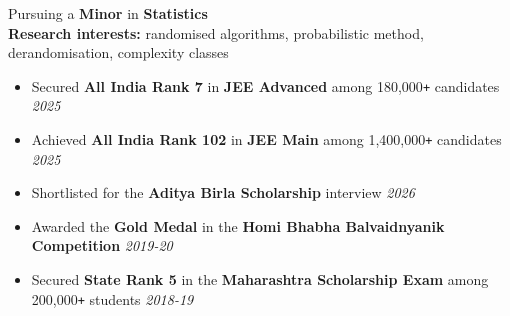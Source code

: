 \documentclass[11pt]{article}
\newcommand{\yr}[1]{\unskip\nobreak\hfill\mbox{\sl\small #1}}
\newcommand{\xfill}[2][1ex]{%
	\dimen0=#2\advance\dimen0 by #1
	\leaders\hrule height \dimen0 depth -#1\hfill
}
\renewcommand{\section}[1]{%
	\par\vspace{9pt}
	{\color{Blue}{\Large\scshape\raggedright #1\xfill[0pt]{0.5pt}}}\par\vspace{3pt}
}
\begin{document}
Pursuing a {\bf Minor} in {\bf Statistics} \\
{\bf Research interests:} randomised algorithms, probabilistic method, derandomisation, complexity classes


\section{Scholastic Achievements}

\begin{itemize}
    \item Secured \textbf{All India Rank 7} in \textbf{JEE Advanced} among 180,000\texttt{+} candidates \yr{2025}
    \item Achieved \textbf{All India Rank 102} in \textbf{JEE Main} among 1,400,000\texttt{+} candidates \yr{2025}
    \item Shortlisted for the \textbf{Aditya Birla Scholarship} interview \yr{2026}
    \item Awarded the \textbf{Gold Medal} in the \textbf{Homi Bhabha Balvaidnyanik Competition} \yr{2019-20}
    \item Secured \textbf{State Rank 5} in the \textbf{Maharashtra Scholarship Exam} among 200,000\texttt{+} students \yr{2018-19}
\end{itemize}

\end{document}
